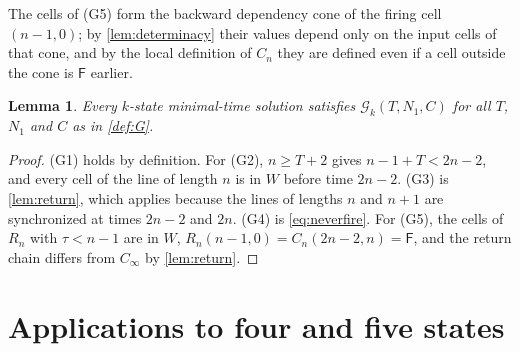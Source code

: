 \documentclass[3p]{elsarticle}
\newtheorem{lemma}[theorem]{Lemma}
\theoremstyle{definition}
\newcommand{\Fq}{\mathsf F}
\newcommand{\G}{\mathcal G}
\begin{document}
The cells of (G5) form the backward dependency cone of the firing cell
$(n-1,0)$; by \cref{lem:determinacy} their values depend only on the input
cells of that cone, and by the local definition of $C_n$ they are defined even
if a cell outside the cone is $\Fq$ earlier.

\begin{lemma}\label{lem:G}
Every $k$-state minimal-time solution satisfies $\G_k(T,N_1,C)$ for all $T$,
$N_1$ and $C$ as in \cref{def:G}.
\end{lemma}

\begin{proof}
(G1) holds by definition. For (G2), $n\ge T+2$ gives $n-1+T<2n-2$, and every
cell of the line of length $n$ is in $W$ before time $2n-2$. (G3) is
\cref{lem:return}, which applies because the lines of lengths $n$ and $n+1$
are synchronized at times $2n-2$ and $2n$. (G4) is \eqref{eq:neverfire}. For
(G5), the cells of $R_n$ with $\tau<n-1$ are in $W$, $R_n(n-1,0)=C_n(2n-2,n)=\Fq$,
and the return chain differs from $C_\infty$ by \cref{lem:return}.
\end{proof}

\section{Applications to four and five states}\label{sec:computations}
\end{document}
